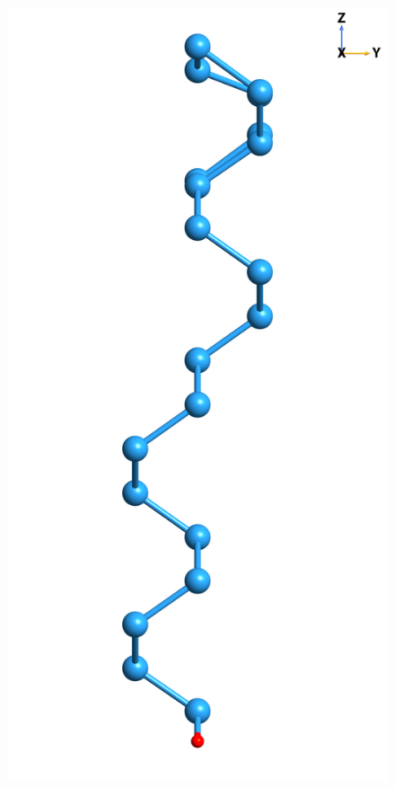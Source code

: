 {\begin{figure}
\begin{minipage}[b]{0.31\textwidth}
        \label{fig:2x1front}
    \end{minipage}
    \begin{minipage}[b]{0.31\textwidth}
        \centering
        \includegraphics[width=\textwidth]{content/figures/source/structure/Si2x1-side}

\end{minipage}
\end{figure}}
